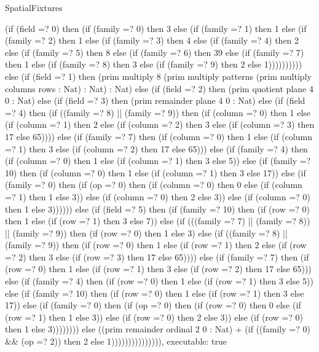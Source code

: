 \begin{lexlean}{SpatialFixtures}
\begin{semanticmodule}
{      (if (field =? 0) then (if (family =? 0) then 3 else (if (family =? 1) then 1 else (if (family =? 2) then 1 else (if (family =? 3) then 4 else (if (family =? 4) then 2 else (if (family =? 5) then 8 else (if (family =? 6) then 39 else (if (family =? 7) then 1 else (if (family =? 8) then 3 else (if (family =? 9) then 2 else 1)))))))))) else (if (field =? 1) then (prim multiply 8 (prim multiply patterns (prim multiply columns rows : Nat) : Nat) : Nat) else (if (field =? 2) then (prim quotient plane 4 0 : Nat) else (if (field =? 3) then (prim remainder plane 4 0 : Nat) else (if (field =? 4) then (if ((family =? 8) || (family =? 9)) then (if (column =? 0) then 1 else (if (column =? 1) then 2 else (if (column =? 2) then 3 else (if (column =? 3) then 17 else 65)))) else (if (family =? 7) then (if (column =? 0) then 1 else (if (column =? 1) then 3 else (if (column =? 2) then 17 else 65))) else (if (family =? 4) then (if (column =? 0) then 1 else (if (column =? 1) then 3 else 5)) else (if (family =? 10) then (if (column =? 0) then 1 else (if (column =? 1) then 3 else 17)) else (if (family =? 0) then (if (op =? 0) then (if (column =? 0) then 0 else (if (column =? 1) then 1 else 3)) else (if (column =? 0) then 2 else 3)) else (if (column =? 0) then 1 else 3)))))) else (if (field =? 5) then (if (family =? 10) then (if (row =? 0) then 1 else (if (row =? 1) then 3 else 7)) else (if (((family =? 7) || (family =? 8)) || (family =? 9)) then (if (row =? 0) then 1 else 3) else (if ((family =? 8) || (family =? 9)) then (if (row =? 0) then 1 else (if (row =? 1) then 2 else (if (row =? 2) then 3 else (if (row =? 3) then 17 else 65)))) else (if (family =? 7) then (if (row =? 0) then 1 else (if (row =? 1) then 3 else (if (row =? 2) then 17 else 65))) else (if (family =? 4) then (if (row =? 0) then 1 else (if (row =? 1) then 3 else 5)) else (if (family =? 10) then (if (row =? 0) then 1 else (if (row =? 1) then 3 else 17)) else (if (family =? 0) then (if (op =? 0) then (if (row =? 0) then 0 else (if (row =? 1) then 1 else 3)) else (if (row =? 0) then 2 else 3)) else (if (row =? 0) then 1 else 3)))))))) else ((prim remainder ordinal 2 0 : Nat) + (if ((family =? 0) && (op =? 2)) then 2 else 1))))))))))))))),
  executable: true
}


\end{semanticmodule}
\end{lexlean}
